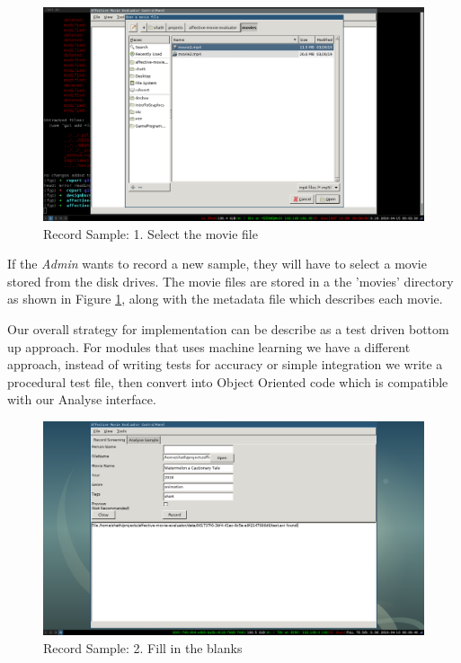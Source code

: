 \documentclass[12pt,a4paper,man]{report}
\begin{document}
\begin{figure}[htbp]
\centering
\includegraphics[width=5in]{./ext_img/sc1.1.png}
\caption{\label{fig:sc12}
Record Sample: 1. Select the movie file}
\end{figure}

If the \emph{Admin} wants to record a new sample, they will have to select a movie stored from the disk drives. The movie files are stored in a the 'movies' directory as shown in Figure \ref{fig:sc12}, along with the metadata file which describes each movie.

Our overall strategy for implementation can be describe as a test driven bottom up approach. For modules that uses machine learning we have a different approach, instead of writing tests for accuracy or simple integration we write a procedural test file, then convert into Object Oriented code which is compatible with our Analyse interface.


\begin{figure}[htbp]
\centering
\includegraphics[width=5in]{./ext_img/sc2.png}
\caption{\label{fig:sc2}
Record Sample: 2. Fill in the blanks}
\end{figure}
\end{document}
